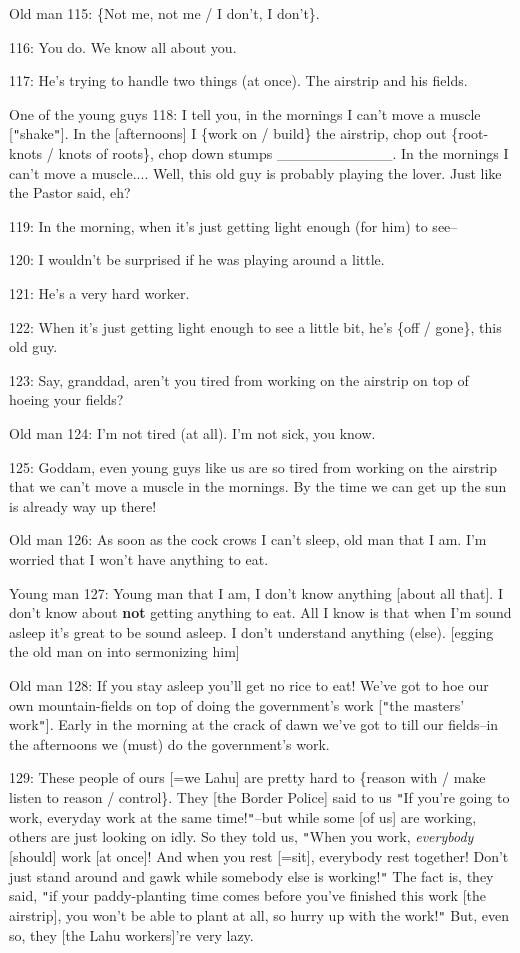 Old man 115: \{Not me, not me / I don't, I don't\}.

116: You do. We know all about you.

117: He's trying to handle two things (at once). The airstrip and his fields.

One of the young guys 118: I tell you, in the mornings I can't move a muscle [\texttt{"}shake\texttt{"}].
In the [afternoons] I \{work on / build\} the airstrip, chop out \{root-knots /
knots of roots\}, chop down stumps \_\_\_\_\_\_\_\_\_\_\_. In the mornings I can't
move a muscle.... Well, this old guy is probably playing the lover. Just like the
Pastor said, eh?

119: In the morning, when it's just getting light enough (for him) to see--

120: I wouldn't be surprised if he was playing around a little.

121: He's a very hard worker.

122: When it's just getting light enough to see a little bit, he's \{off / gone\},
this old guy.

123: Say, granddad, aren't you tired from working on the airstrip on top of hoeing
your fields?

Old man 124: I'm not tired (at all). I'm not sick, you know.

125: Goddam, even young guys like us are so tired from working on the airstrip
that we can't move a muscle in the mornings. By the time we can get up the sun
is already way up there!

Old man 126: As soon as the cock crows I can't sleep, old man that I am. I'm worried
that I won't have anything to eat.

Young man 127: Young man that I am, I don't know anything [about all that]. I don't
know about \textbf{not} getting anything to eat. All I know is that when I'm sound
asleep it's great to be sound asleep. I don't understand anything (else). [egging
the old man on into sermonizing him]

Old man 128: If you stay asleep you'll get no rice to eat! We've got to hoe our
own mountain-fields on top of doing the government's work [\texttt{"}the masters'
work\texttt{"}]. Early in the morning at the crack of dawn we've got to till our
fields--in the afternoons we (must) do the government's work.

129: These people of ours [=we Lahu] are pretty hard to \{reason with / make listen
to reason / control\}. They [the Border Police] said to us \texttt{"}If you're
going to work, everyday work at the same time!\texttt{"}--but while some [of us]
are working, others are just looking on idly. So they told us, \texttt{"}When you
work, \textit{everybody} [should] work [at once]! And when you rest [=sit], everybody
rest together! Don't just stand around and gawk while somebody else is working!\texttt{"}
The fact is, they said, \texttt{"}if your paddy-planting time comes before you've
finished this work [the airstrip], you won't be able to plant at all, so hurry
up with the work!\texttt{"} But, even so, they [the Lahu workers]'re very lazy.

